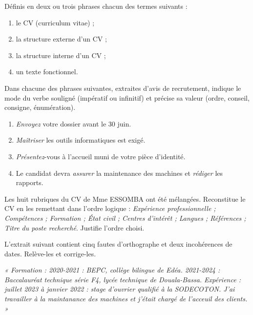 \documentclass[11pt]{article}
\newcommand{\cle}[1]{{\popxbold\color{popdark}#1}}
\newcounter{popsec}
\newcounter{popsub}
\newcommand{\courssub}[1]{%
  \stepcounter{popsub}%
  \par\vspace{9pt}\noindent{\popxbold\fontsize{11.5}{13}\selectfont\color{popink}{\color{poporange}\thepopsec.\thepopsub}\hspace{6pt}#1}\par\nopagebreak\vspace{4pt}
}
\begin{document}
\begin{exercice}[Définitions]
Définis en deux ou trois phrases chacun des termes suivants :
\begin{enumerate}
\item le \cle{CV} (curriculum vitae) ;
\item la \cle{structure externe} d'un CV ;
\item la \cle{structure interne} d'un CV ;
\item un \cle{texte fonctionnel}.
\end{enumerate}
\end{exercice}

\begin{exercice}
Dans chacune des phrases suivantes, extraites d'avis de recrutement, indique le mode du verbe souligné (impératif ou infinitif) et précise sa valeur (ordre, conseil, consigne, énumération).
\begin{enumerate}
\item \emph{Envoyez} votre dossier avant le 30 juin.
\item \emph{Maîtriser} les outils informatiques est exigé.
\item \emph{Présentez}-vous à l'accueil muni de votre pièce d'identité.
\item Le candidat devra \emph{assurer} la maintenance des machines et \emph{rédiger} les rapports.
\end{enumerate}
\end{exercice}

\courssub{Je m'entraîne}

\begin{exercice}
Les huit rubriques du CV de Mme ESSOMBA ont été mélangées. Reconstitue le CV en les remettant dans l'ordre logique : \emph{Expérience professionnelle ; Compétences ; Formation ; État civil ; Centres d'intérêt ; Langues ; Références ; Titre du poste recherché}. Justifie l'ordre choisi.
\end{exercice}

\begin{exercice}
L'extrait suivant contient cinq fautes d'orthographe et deux incohérences de dates. Relève-les et corrige-les.

\emph{« Formation : 2020-2021 : BEPC, collège bilingue de Edéa. 2021-2024 : Baccalauréat technique série F4, lycée technique de Douala-Bassa. Expérience : juillet 2023 à janvier 2022 : stage d'ouvrier qualifié à la SODECOTON. J'ai travailler à la maintanance des machines et j'était chargé de l'acceuil des clients. »}
\end{exercice}
\end{document}
